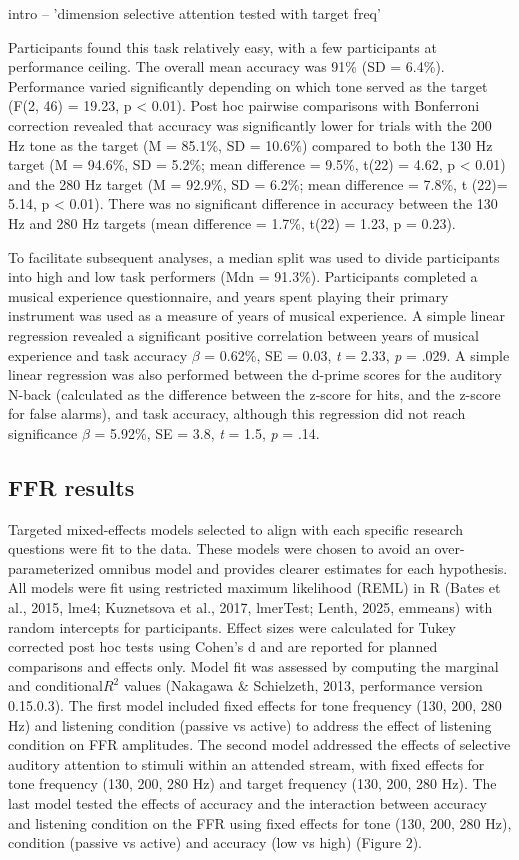 intro -- 'dimension selective attention tested with target freq'


Participants found this task relatively easy, with a few participants at performance ceiling. The overall mean accuracy was 91\% (SD = 6.4\%). Performance varied significantly depending on which tone served as the target (F(2, 46) = 19.23, p < 0.01). Post hoc pairwise comparisons with Bonferroni correction revealed that accuracy was significantly lower for trials with the 200 Hz tone as the target (M = 85.1\%, SD = 10.6\%) compared to both the 130 Hz target (M = 94.6\%, SD = 5.2\%; mean difference = 9.5\%, t(22) = 4.62, p < 0.01) and the 280 Hz target (M = 92.9\%, SD = 6.2\%; mean difference = 7.8\%, t (22)= 5.14, p < 0.01). There was no significant difference in accuracy between the 130 Hz and 280 Hz targets (mean difference = 1.7\%, t(22) = 1.23, p = 0.23). 

To facilitate subsequent analyses, a median split was used to divide participants into high and low task performers (Mdn = 91.3\%). Participants completed a musical experience questionnaire, and years spent playing their primary instrument was used as a measure of years of musical experience. A simple linear regression revealed a significant positive correlation between years of musical experience and task accuracy $\beta$ = 0.62\%, SE  = 0.03, \textit{t} = 2.33, \textit{p} = .029. A simple linear regression was also performed between the d-prime scores for the auditory N-back (calculated as the difference between the z-score for hits, and the z-score for false alarms), and task accuracy, although this regression did not reach significance $\beta$ = 5.92\%, SE  = 3.8, \textit{t} = 1.5, \textit{p} = .14.


\subsection*{FFR results}
Targeted mixed-effects models selected to align with each specific research questions were fit to the data. These models were chosen to avoid an over-parameterized omnibus model and provides clearer estimates for each hypothesis. All models were fit using restricted maximum likelihood (REML) in R (Bates et al., 2015, lme4; Kuznetsova et al., 2017, lmerTest; Lenth, 2025, emmeans) with random intercepts for participants. Effect sizes were calculated for Tukey corrected post hoc tests using Cohen’s d and are reported for planned comparisons and effects only. Model fit was assessed by computing the marginal and conditional$R^2$ values (Nakagawa \& Schielzeth, 2013, performance version 0.15.0.3). The first model included fixed effects for tone frequency (130, 200, 280 Hz) and listening condition (passive vs active) to address the effect of listening condition on FFR amplitudes. The second model addressed the effects of selective auditory attention to stimuli within an attended stream, with fixed effects for tone frequency (130, 200, 280 Hz) and target frequency (130, 200, 280 Hz). The last model tested the effects of accuracy and the interaction between accuracy and listening condition on the FFR using fixed effects for tone (130, 200, 280 Hz), condition (passive vs active) and accuracy (low vs high) (Figure 2).

